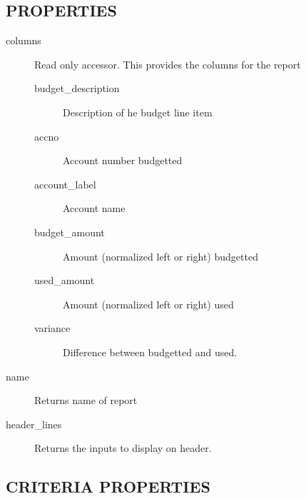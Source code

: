 \begin{description}
\begin{description}
\begin{description}
\begin{description}
\begin{description}
\begin{description}
\begin{description}
\begin{description}
\begin{description}
\begin{description}
\subsection*{PROPERTIES\label{LedgerSMB::DBObject::Report::Budget::Variance_PROPERTIES}}
\begin{description}

\item[{columns}] \mbox{}

Read only accessor.  This provides the columns for the report

\begin{description}

\item[{budget\_description}] \mbox{}

Description of he budget line item


\item[{accno}] \mbox{}

Account number budgetted


\item[{account\_label}] \mbox{}

Account name


\item[{budget\_amount}] \mbox{}

Amount (normalized left or right) budgetted


\item[{used\_amount}] \mbox{}

Amount (normalized left or right) used


\item[{variance}] \mbox{}

Difference between budgetted and used.

\end{description}

\item[{name}] \mbox{}

Returns name of report


\item[{header\_lines}] \mbox{}

Returns the inputs to display on header.

\end{description}
\subsection*{CRITERIA PROPERTIES\label{LedgerSMB::DBObject::Report::Budget::Variance_CRITERIA_PROPERTIES}}
\begin{description}


\end{description}
\end{description}
\end{description}
\end{description}
\end{description}
\end{description}
\end{description}
\end{description}
\end{description}
\end{description}
\end{description}
